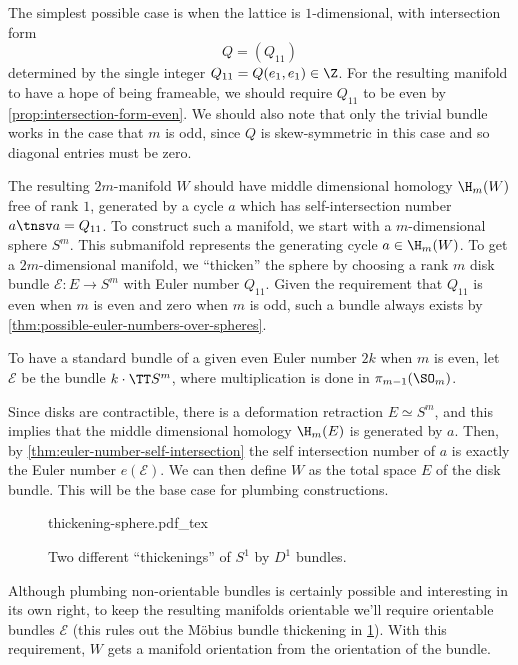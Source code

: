 The simplest possible case is when the lattice is $1$-dimensional, with intersection form
\[
	Q =  (Q_{11})
\]
determined by the single integer $Q_{11}=Q(e_1,e_1)\in \Z$.
For the resulting manifold to have a hope of being frameable, we should require $Q_{11}$ to be even by \cref{prop:intersection-form-even}. We should also note that only the trivial bundle works in the case that $m$ is odd, since $Q$ is skew-symmetric in this case and so diagonal entries must be zero.

The resulting $2m$-manifold $W$ should have middle dimensional homology $\H_m(W)$ free of rank $1$, generated by a cycle $a$ which has self-intersection number $a \tnsv a= Q_{11}$. To construct such a manifold, we start with a $m$-dimensional sphere $S^m$. This submanifold represents the generating cycle $a\in \H_m(W)$.
To get a $2m$-dimensional manifold, we ``thicken'' the sphere by choosing a rank $m$ disk bundle $\mathcal{E} : E \to S^m$ with Euler number $Q_{11}$. Given the requirement that $Q_{11}$ is even when $m$ is even and zero when $m$ is odd, such a bundle always exists by \cref{thm:possible-euler-numbers-over-spheres}.
\begin{remark}
	To have a standard bundle of a given even Euler number $2k$ when $m$ is even, let $\mathcal{E}$ be the bundle $k\cdot \TT S^m$, where multiplication is done in $\pi_{m-1}(\SO_m)$.
\end{remark}
Since disks are contractible, there is a deformation retraction $E\simeq S^m$, and this implies that the middle dimensional homology $\H_m(E)$ is generated by $a$.
Then, by \cref{thm:euler-number-self-intersection} the self intersection number of $a$ is exactly the Euler number $e(\mathcal{E})$.
We can then define $W$ as the total space $E$ of the disk bundle. This will be the base case for plumbing constructions.
\begin{figure}[ht]
	\centering
	{thickening-sphere.pdf_tex}
	\caption{Two different ``thickenings'' of $S^1$ by $D^1$ bundles.}\label{fig:thickening-sphere}
\end{figure}
\begin{remark}
	Although plumbing non-orientable bundles is certainly possible and interesting in its own right, to keep the resulting manifolds orientable we'll require orientable bundles $\mathcal{E}$ (this rules out the M\"obius bundle thickening in \cref{fig:thickening-sphere}). With this requirement, $W$ gets a manifold orientation from the orientation of the bundle.
\end{remark}


